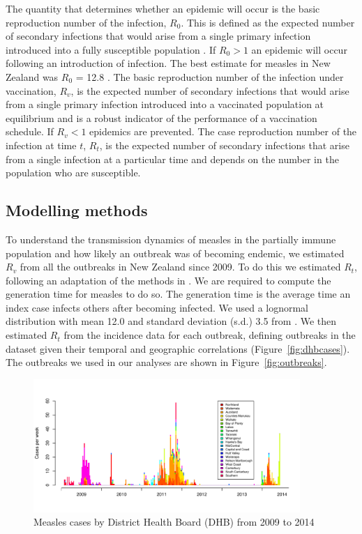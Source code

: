 \documentclass{article}
\begin{document}
The quantity that determines whether an epidemic will occur is the basic reproduction number of the infection, $R_0$. This is defined as the expected number of secondary infections that would arise from a single primary infection introduced into a fully susceptible population \citep{anderson91, diekmann13}. If $R_0 > 1$ an epidemic will occur following an introduction of infection. The best estimate for measles in New Zealand was $R_0$ = 12.8 \citep{roberts4}. The basic reproduction number of the infection under vaccination, $R_v$, is the expected number of secondary infections that would arise from a single primary infection introduced into a vaccinated population at equilibrium and is a robust indicator of the performance of a vaccination schedule. If $R_v < 1$ epidemics are prevented. The case reproduction number of the infection at time $t$, $R_t$, is the expected number of secondary infections that arise from a single infection at a particular time and depends on the number in the population who are susceptible.

\subsection{Modelling methods}

To understand the transmission dynamics of measles in the partially immune population and how likely an outbreak was of becoming endemic, we estimated $R_v$ from all the outbreaks in New Zealand since 2009. To do this we estimated $R_t$, following an adaptation of the methods in \citep{obidia12,wallinga4}. We are required to compute the generation time for measles to do so. The generation time is the average time an index case infects others after becoming infected. We used a lognormal distribution with mean 12.0 and standard deviation (s.d.) 3.5 from \citep{klinkenberg11}. We then estimated $R_t$ from the incidence data for each outbreak, defining outbreaks in the dataset given their temporal and geographic correlations (Figure~\autoref{fig:dhbcases}). The outbreaks we used in our analyses are shown in Figure~\autoref{fig:outbreaks}.

\begin{figure}[H]
      \centering
     \includegraphics[width=0.9\textwidth]{cases_by_dhb_2009_2014.pdf}
     \caption{Measles cases by District Health Board (DHB) from 2009 to 2014}
     \label{fig:dhbcases}
\end{figure}
\end{document}
